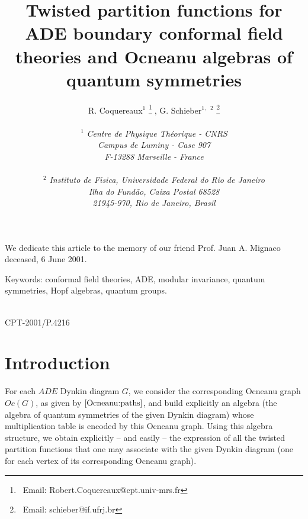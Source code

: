 \documentclass[a4paper,11pt]{article}
\title{
Twisted partition functions for ADE boundary conformal field theories
       and Ocneanu algebras of quantum  symmetries
         \vspace{0.8cm}}
\author{R. Coquereaux${}^{1}$  \thanks{~Email:
Robert.Coquereaux@cpt.univ-mrs.fr}$\;$,
              G. Schieber${}^{1,}$  ${}^2$ \thanks{~Email:
schieber@if.ufrj.br} \\
\\
${}^1$ {\it Centre de Physique Th\'eorique - CNRS} \\
             {\it Campus de Luminy - Case 907}           \\
             {\it F-13288 Marseille - France}            \\
\\
${}^2$ {\it Instituto de F\'{\i}sica, Universidade Federal do Rio de
Janeiro} \\
             {\it Ilha do Fund\~ao, Caixa Postal 68528}\\
             {\it 21945-970, Rio de Janeiro, Brasil}\\
}
\date{}
\let\sect=\section
\def\section{\newpage\sect}
\begin{document}
\thispagestyle{empty}
\begin{titlepage}
\maketitle
{}

\vspace{1.cm}

\begin{center}
We dedicate this article to the memory of our friend  Prof. Juan A. Mignaco
deceased, 6 June 2001.
\end{center}



\vspace{2. cm}

\noindent Keywords: conformal field theories, ADE, modular invariance,
quantum symmetries, Hopf algebras, quantum groups.
\vspace{1.0cm}


\vspace{2. cm}

\\
\noindent CPT-2001/P.4216 \\


\vspace*{0.3 cm}

\end{titlepage}




\section{Introduction}

For each $ADE$ Dynkin diagram $G$, we consider the corresponding
Ocneanu graph $Oc(G)$, as given by $\cite{Ocneanu:paths}$, and build
explicitly an algebra (the algebra of quantum symmetries
of the given Dynkin diagram)
whose multiplication table is encoded by this Ocneanu graph. Using
this algebra structure, we obtain explicitly -- and easily -- the
expression of all
the twisted partition functions that one may associate with
the given Dynkin diagram (one for each vertex of its corresponding
Ocneanu graph).
\end{document}
